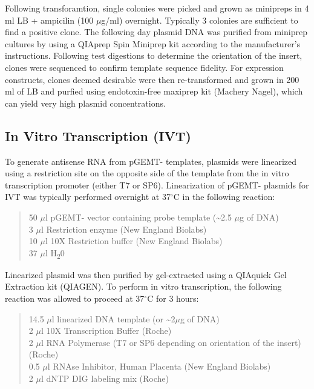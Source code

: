 \documentclass[onehalf,12pt]{beavtex}
\begin{document}
  Following transforamtion, single colonies were picked and grown as
  minipreps in 4 ml LB + ampicilin (100 \(\mu\)g/ml) overnight. Typically
  3 colonies are sufficient to find a positive clone. The following day
  plasmid DNA was purified from miniprep cultures by using a QIAprep Spin
  Miniprep kit according to the manufacturer's instructions. Following
  test digestions to determine the orientation of the insert, clones were
  sequenced to confirm template sequence fidelity. For expression
  constructs, clones deemed desirable were then re-transformed and grown
  in 200 ml of LB and purfied using endotoxin-free maxiprep kit (Machery
  Nagel), which can yield very high plasmid concentrations.
  
  \subsection{In Vitro Transcription
  (IVT)}\label{in-vitro-transcription-ivt}
  
  To generate antisense RNA from pGEMT- templates, plasmids were
  linearized using a restriction site on the opposite side of the template
  from the in vitro transcription promoter (either T7 or SP6).
  Linearization of pGEMT- plasmids for IVT was typically performed
  overnight at 37\(^\circ\)C in the following reaction:
  
  \begin{quote}
  50 \(\mu\)l pGEMT- vector containing probe template
  (\textasciitilde{}2.5 \(\mu\)g of DNA)\\
  3 \(\mu\)l Restriction enzyme (New England Biolabs)\\
  10 \(\mu\)l 10X Restriction buffer (New England Biolabs)\\
  37 \(\mu\)l H\textsubscript{2}0
  \end{quote}
  
  Linearized plasmid was then purified by gel-extracted using a QIAquick
  Gel Extraction kit (QIAGEN). To perform in vitro transcription, the
  following reaction was allowed to proceed at 37\(^\circ\)C for 3 hours:
  
  \begin{quote}
  14.5 \(\mu\)l linearized DNA template (or \textasciitilde{}2\(\mu\)g of
  DNA)\\
  2 \(\mu\)l 10X Transcription Buffer (Roche)\\
  2 \(\mu\)l RNA Polymerase (T7 or SP6 depending on orientation of the
  insert) (Roche)\\
  0.5 \(\mu\)l RNAse Inhibitor, Human Placenta (New England Biolabs)\\
  2 \(\mu\)l dNTP DIG labeling mix (Roche)
  \end{quote}
  
\end{document}
